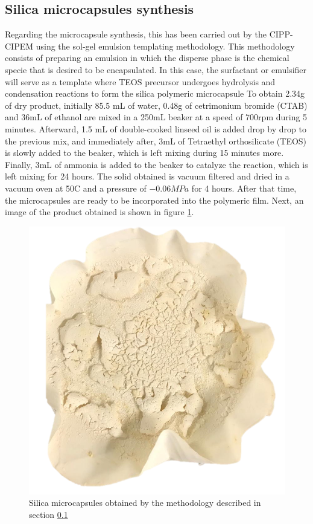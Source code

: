 \begin{refsection}
\subsection{Silica microcapsules synthesis}\label{sec:capusules}
Regarding the microcapsule synthesis, this has been carried out by the CIPP-CIPEM using the sol-gel emulsion templating methodology. This methodology consists of preparing an emulsion in which the disperse phase is the chemical specie that is desired to be encapsulated. In this case, the surfactant or emulsifier will serve as a template where TEOS precursor undergoes hydrolysis and condensation reactions to form the silica polymeric microcapsule \cites{GonzalezPungo2018EvaluacionActivos, GomezAlfonzo2018AceiteOxigeno} To obtain 2.34g of dry product, initially 85.5 mL of water, 0.48g of cetrimonium bromide (CTAB) and 36mL of ethanol are mixed in a 250mL beaker at a speed of 700rpm during 5 minutes. Afterward, 1.5 mL of double-cooked linseed oil is added drop by drop to the previous mix, and immediately after, 3mL of Tetraethyl orthosilicate (TEOS) is slowly added to the beaker, which is left mixing during 15 minutes more. Finally, 3mL of ammonia is added to the beaker to catalyze the reaction, which is left mixing for 24 hours. The solid obtained is vacuum filtered and dried in a vacuum oven at 50\degree C and a pressure of $-0.06 MPa$ for 4 hours. After that time, the microcapsules are ready to be incorporated into the polymeric film. Next, an image of the product obtained is shown in figure \ref{fig:capsules}. 

\begin{figure}[ht]
    \centering
    \includegraphics[width=0.3\linewidth]{Documento_Latex/Imagenes/capsulas.png}
    \caption{Silica microcapsules obtained by the methodology described in section \ref{sec:capusules}}
    \label{fig:capsules}
\end{figure}


\end{refsection}
